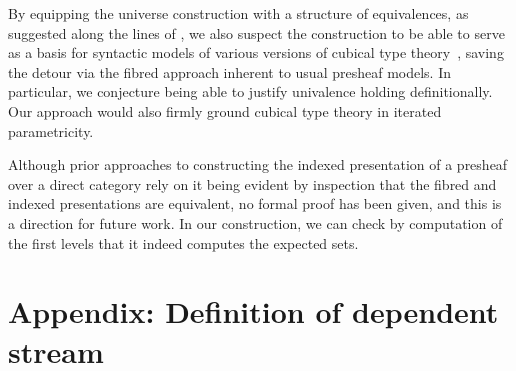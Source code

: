 \documentclass{art.cls/art}
\begin{document}
By equipping the universe construction with a structure of equivalences, as suggested along the lines of \cite{altenkirch15}, we also suspect the construction to be able to serve as a basis for syntactic models of various versions of cubical type theory~\cite{bezem13,cohen16,angiuli21}, saving the detour via the fibred approach inherent to usual presheaf models. In particular, we conjecture being able to justify univalence holding definitionally. Our approach would also firmly ground cubical type theory in iterated parametricity.

Although prior approaches to constructing the indexed presentation of a presheaf over a direct category rely on it being evident by inspection that the fibred and indexed presentations are equivalent, no formal proof has been given, and this is a direction for future work. In our construction, we can check by computation of the first levels that it indeed computes the expected sets.




\newpage
\appendix
{}
\section*{Appendix: Definition of dependent stream\label{app:depstream}}
\end{document}
